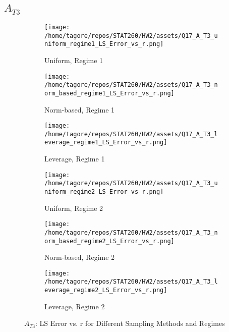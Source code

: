 \documentclass{article}
\begin{document}
\newpage

\subsection*{\(A_{T3}\)}

\begin{figure}[H]
    \centering
    \begin{subfigure}[b]{0.32\textwidth}
        \centering
        \texttt{[image: /home/tagore/repos/STAT260/HW2/assets/Q17\_A\_T3\_uniform\_regime1\_LS\_Error\_vs\_r.png]}
        \caption{Uniform, Regime 1}
        \label{fig:T3_uniform_regime1}
    \end{subfigure}
    \begin{subfigure}[b]{0.32\textwidth}
        \centering
        \texttt{[image: /home/tagore/repos/STAT260/HW2/assets/Q17\_A\_T3\_norm\_based\_regime1\_LS\_Error\_vs\_r.png]}
        \caption{Norm-based, Regime 1}
        \label{fig:T3_norm_based_regime1}
    \end{subfigure}
    \begin{subfigure}[b]{0.32\textwidth}
        \centering
        \texttt{[image: /home/tagore/repos/STAT260/HW2/assets/Q17\_A\_T3\_leverage\_regime1\_LS\_Error\_vs\_r.png]}
        \caption{Leverage, Regime 1}
        \label{fig:T3_leverage_regime1}
    \end{subfigure}
    
    \vspace{0.5cm}
    
    \begin{subfigure}[b]{0.32\textwidth}
        \centering
        \texttt{[image: /home/tagore/repos/STAT260/HW2/assets/Q17\_A\_T3\_uniform\_regime2\_LS\_Error\_vs\_r.png]}
        \caption{Uniform, Regime 2}
        \label{fig:T3_uniform_regime2}
    \end{subfigure}
    \begin{subfigure}[b]{0.32\textwidth}
        \centering
        \texttt{[image: /home/tagore/repos/STAT260/HW2/assets/Q17\_A\_T3\_norm\_based\_regime2\_LS\_Error\_vs\_r.png]}
        \caption{Norm-based, Regime 2}
        \label{fig:T3_norm_based_regime2}
    \end{subfigure}
    \begin{subfigure}[b]{0.32\textwidth}
        \centering
        \texttt{[image: /home/tagore/repos/STAT260/HW2/assets/Q17\_A\_T3\_leverage\_regime2\_LS\_Error\_vs\_r.png]}
        \caption{Leverage, Regime 2}
        \label{fig:T3_leverage_regime2}
    \end{subfigure}
    
    \caption{\(A_{T3}\): LS Error vs. r for Different Sampling Methods and Regimes}
    \label{fig:T3_comparison}
\end{figure}
\end{document}

